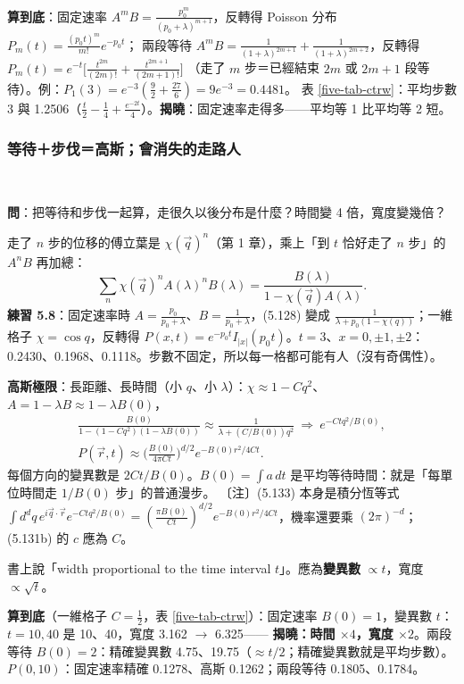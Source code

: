 \textbf{算到底}：固定速率 $A^mB=\frac{p_0^m}{(p_0+\lambda)^{m+1}}$，反轉得 Poisson 分布 $P_m(t)=\frac{(p_0t)^m}{m!}e^{-p_0t}$；
兩段等待 $A^mB=\frac{1}{(1+\lambda)^{2m+1}}+\frac{1}{(1+\lambda)^{2m+2}}$，反轉得 $P_m(t)=e^{-t}\big[\frac{t^{2m}}{(2m)!}+\frac{t^{2m+1}}{(2m+1)!}\big]$
（走了 $m$ 步＝已經結束 $2m$ 或 $2m+1$ 段等待）。例：$P_1(3)=e^{-3}(\frac92+\frac{27}6)=9e^{-3}=0.4481$。
表 \ref{five-tab-ctrw}：平均步數 3 與 1.2506（$\frac t2-\frac14+\frac{e^{-2t}}4$）。\textbf{揭曉}：固定速率走得多——平均等 1 比平均等 2 短。

\subsubsection{等待＋步伐＝高斯；會消失的走路人}
\leavevmode{}\ \par\nopagebreak

\textbf{問}：把等待和步伐一起算，走很久以後分布是什麼？時間變 4 倍，寬度變幾倍？

走了 $n$ 步的位移的傅立葉是 $\chi(\vec q)^n$（第 1 章），乘上「到 $t$ 恰好走了 $n$ 步」的 $A^nB$ 再加總：
\[\sum_n\chi(\vec q)^nA(\lambda)^nB(\lambda)=\frac{B(\lambda)}{1-\chi(\vec q)A(\lambda)}.\tag{5.124--5.128}\]
\textbf{練習 5.8}：固定速率時 $A=\frac{p_0}{p_0+\lambda}$、$B=\frac1{p_0+\lambda}$，(5.128) 變成 $\frac{1}{\lambda+p_0(1-\chi(q))}$；一維格子 $\chi=\cos q$，反轉得
$P(x,t)=e^{-p_0t}I_{|x|}(p_0t)$。$t=3$、$x=0,\pm1,\pm2$：0.2430、0.1968、0.1118。步數不固定，所以每一格都可能有人（沒有奇偶性）。

\textbf{高斯極限}：長距離、長時間（小 $q$、小 $\lambda$）：$\chi\approx1-Cq^2$、$A=1-\lambda B\approx1-\lambda B(0)$，
\begin{gather*}
\frac{B(0)}{1-(1-Cq^2)(1-\lambda B(0))}\approx\frac{1}{\lambda+(C/B(0))q^2}\ \Rightarrow\ e^{-Ctq^2/B(0)},\tag{5.129--5.131}\\
P(\vec r,t)\approx\Big(\frac{B(0)}{4\pi Ct}\Big)^{d/2}e^{-B(0)r^2/4Ct}.\tag{5.133 更正}
\end{gather*}
每個方向的變異數是 $2Ct/B(0)$。$B(0)=\int a\,dt$ 是平均等待時間：就是「每單位時間走 $1/B(0)$ 步」的普通漫步。
〔注〕(5.133) 本身是積分恆等式 $\int d^dq\,e^{i\vec q\cdot\vec r}e^{-Ctq^2/B(0)}=(\frac{\pi B(0)}{Ct})^{d/2}e^{-B(0)r^2/4Ct}$，機率還要乘 $(2\pi)^{-d}$；(5.131b) 的 $c$ 應為 $C$。
\begin{errbox}[p.~124，(5.133) 後]
書上說「width proportional to the time interval $t$」。應為\textbf{變異數} $\propto t$，寬度 $\propto\sqrt t$。
\end{errbox}
\textbf{算到底}（一維格子 $C=\frac12$，表 \ref{five-tab-ctrw}）：固定速率 $B(0)=1$，變異數 $t$：$t=10,40$ 是 10、40，寬度 3.162 $\to$ 6.325——
\textbf{揭曉：時間 $\times4$，寬度 $\times2$}。兩段等待 $B(0)=2$：精確變異數 4.75、19.75（$\approx t/2$；精確變異數就是平均步數）。
$P(0,10)$：固定速率精確 0.1278、高斯 0.1262；兩段等待 0.1805、0.1784。

